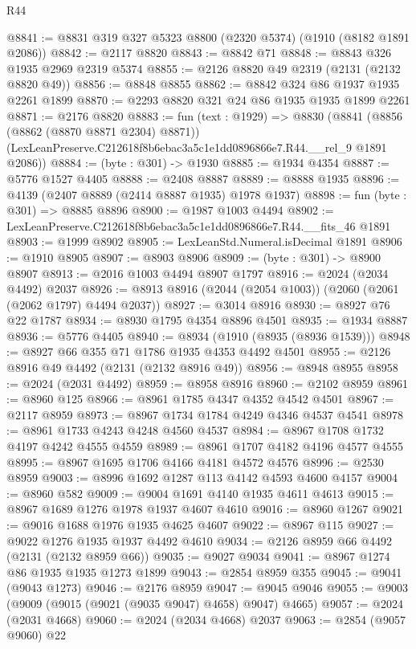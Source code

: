 \begin{lexlean}{R44}
\begin{coremodule}
@8841 := @8831 @319 @327 @5323 @8800 (@2320 @5374) (@1910 (@8182 @1891 @2086))
@8842 := @2117 @8820
@8843 := @8842 @71
@8848 := @8843 @326 @1935 @2969 @2319 @5374
@8855 := @2126 @8820 @49 @2319 (@2131 (@2132 @8820 @49))
@8856 := @8848 @8855
@8862 := @8842 @324 @86 @1937 @1935 @2261 @1899
@8870 := @2293 @8820 @321 @24 @86 @1935 @1935 @1899 @2261
@8871 := @2176 @8820
@8883 := fun (text : @1929) =>
  @8830
    (@8841
      (@8856 (@8862 (@8870 @8871 @2304) @8871))
      (LexLeanPreserve.C212618f8b6ebac3a5c1e1dd0896866e7.R44.__rel_9 @1891 @2086))
@8884 := (byte : @301) -> @1930
@8885 := @1934 @4354
@8887 := @5776 @1527 @4405
@8888 := @2408 @8887
@8889 := @8888 @1935
@8896 := @4139 (@2407 @8889 (@2414 @8887 @1935) @1978 @1937)
@8898 := fun (byte : @301) => @8885 @8896
@8900 := @1987 @1003 @4494
@8902 := LexLeanPreserve.C212618f8b6ebac3a5c1e1dd0896866e7.R44.__fits_46 @1891
@8903 := @1999 @8902
@8905 := LexLeanStd.Numeral.isDecimal @1891
@8906 := @1910 @8905
@8907 := @8903 @8906
@8909 := (byte : @301) -> @8900 @8907
@8913 := @2016 @1003 @4494 @8907 @1797
@8916 := @2024 (@2034 @4492) @2037
@8926 := @8913 @8916 (@2044 (@2054 @1003)) (@2060 (@2061 (@2062 @1797) @4494 @2037))
@8927 := @3014 @8916
@8930 := @8927 @76 @22 @1787
@8934 := @8930 @1795 @4354 @8896 @4501
@8935 := @1934 @8887
@8936 := @5776 @4405
@8940 := @8934 (@1910 (@8935 (@8936 @1539)))
@8948 := @8927 @66 @355 @71 @1786 @1935 @4353 @4492 @4501
@8955 := @2126 @8916 @49 @4492 (@2131 (@2132 @8916 @49))
@8956 := @8948 @8955
@8958 := @2024 (@2031 @4492)
@8959 := @8958 @8916
@8960 := @2102 @8959
@8961 := @8960 @125
@8966 := @8961 @1785 @4347 @4352 @4542 @4501
@8967 := @2117 @8959
@8973 := @8967 @1734 @1784 @4249 @4346 @4537 @4541
@8978 := @8961 @1733 @4243 @4248 @4560 @4537
@8984 := @8967 @1708 @1732 @4197 @4242 @4555 @4559
@8989 := @8961 @1707 @4182 @4196 @4577 @4555
@8995 := @8967 @1695 @1706 @4166 @4181 @4572 @4576
@8996 := @2530 @8959
@9003 := @8996 @1692 @1287 @113 @4142 @4593 @4600 @4157
@9004 := @8960 @582
@9009 := @9004 @1691 @4140 @1935 @4611 @4613
@9015 := @8967 @1689 @1276 @1978 @1937 @4607 @4610
@9016 := @8960 @1267
@9021 := @9016 @1688 @1976 @1935 @4625 @4607
@9022 := @8967 @115
@9027 := @9022 @1276 @1935 @1937 @4492 @4610
@9034 := @2126 @8959 @66 @4492 (@2131 (@2132 @8959 @66))
@9035 := @9027 @9034
@9041 := @8967 @1274 @86 @1935 @1935 @1273 @1899
@9043 := @2854 @8959 @355
@9045 := @9041 (@9043 @1273)
@9046 := @2176 @8959
@9047 := @9045 @9046
@9055 := @9003 (@9009 (@9015 (@9021 (@9035 @9047) @4658) @9047) @4665)
@9057 := @2024 (@2031 @4668)
@9060 := @2024 (@2034 @4668) @2037
@9063 := @2854 (@9057 @9060) @22

\end{coremodule}
\end{lexlean}

